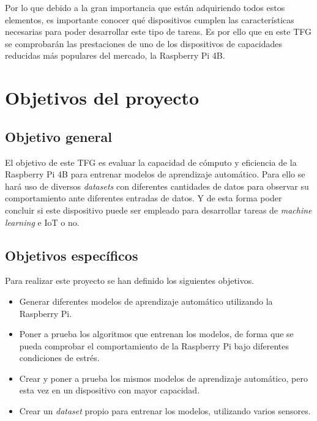 \documentclass[a4paper, 12pt]{book}
\begin{document}
Por lo que debido a la gran importancia que están adquiriendo todos estos elementos, es importante conocer qué dispositivos cumplen las características necesarias para poder desarrollar este tipo de tareas. Es por ello que en este TFG se comprobarán las prestaciones de uno de los dispositivos de capacidades reducidas más populares del mercado, la Raspberry Pi 4B. 



\section{Objetivos del proyecto}
\label{sec:objetivos}

\subsection{Objetivo general} %
\label{sec:objetivo-general} %


El objetivo de este TFG es evaluar la capacidad de cómputo y eficiencia de la Raspberry Pi 4B para entrenar modelos de aprendizaje automático. Para ello se hará uso de diversos \textit{datasets} con diferentes cantidades de datos para observar su comportamiento ante diferentes entradas de datos. Y de esta forma poder concluir si este dispositivo puede ser empleado para desarrollar tareas de \textit{machine learning} e IoT o no.


\subsection{Objetivos específicos}
\label{sec:objetivos-especificos}

Para realizar este proyecto se han definido los siguientes objetivos.

    \begin{itemize}
        \item Generar diferentes modelos de aprendizaje automático utilizando la Raspberry Pi.
        \item Poner a prueba los algoritmos que entrenan los modelos, de forma que se pueda comprobar el comportamiento de la Raspberry Pi bajo diferentes condiciones de estrés.
        \item Crear y poner a prueba los mismos modelos de aprendizaje automático, pero esta vez en un dispositivo con mayor capacidad.
        \item Crear un \textit{dataset} propio para entrenar los modelos, utilizando varios sensores.
    \end{itemize}
\end{document}
